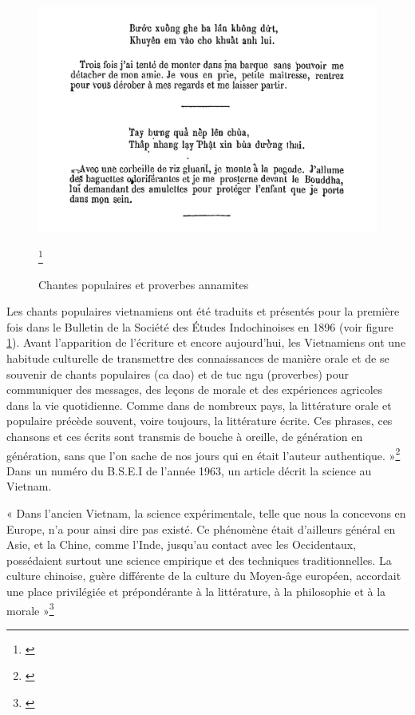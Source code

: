 \begin{figure}
    \centering
    \includegraphics[width=1\linewidth]{img/1896.PNG}
    \caption{Chantes populaires et proverbes annamites} \footnote{\cite{cadao}}
    \label{fig:1896}
\end{figure}
Les chants populaires vietnamiens ont été traduits et présentés pour la première fois dans le Bulletin de la Société des Études Indochinoises en 1896 (voir figure \ref{fig:1896}). Avant l'apparition de l'écriture et encore aujourd'hui, les Vietnamiens ont une habitude culturelle de transmettre des connaissances de manière orale et de se souvenir de chants populaires (ca dao) et de tuc ngu (proverbes) pour communiquer des messages, des leçons de morale et des expériences agricoles dans la vie quotidienne. 
Comme dans de nombreux pays, la littérature orale et populaire précède souvent, voire toujours, la littérature écrite. Ces phrases, ces chansons et ces écrits sont transmis de bouche à oreille, de génération en génération, sans que l'on sache de nos jours qui en était l'auteur authentique. »\footnote{\cite{tinh}}
Dans un numéro du B.S.E.I de l'année 1963, un article décrit la science au Vietnam.

« Dans l'ancien Vietnam, la science expérimentale, telle que nous la concevons en Europe, n'a pour ainsi dire pas existé. Ce phénomène était d'ailleurs général en Asie, et la Chine, comme l'Inde, jusqu'au contact avec les Occidentaux, possédaient surtout une science empirique et des techniques traditionnelles. La culture chinoise, guère différente de la culture du Moyen-âge européen, accordait une place privilégiée et prépondérante à la littérature, à la philosophie et à la morale »\footnote{\cite{bsei}}

